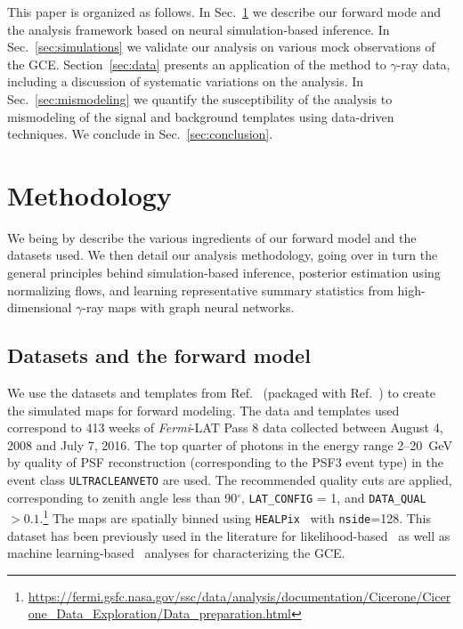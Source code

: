 \documentclass[prd,aps,10pt,nofootinbib,twocolumn,superscriptaddress,preprintnumbers,balancelastpage,longbibliography]{revtex4-1}
\begin{document}
This paper is organized as follows. In Sec.~\ref{sec:analysis} we describe our forward mode and the analysis framework based on neural simulation-based inference. In Sec.~\ref{sec:simulations} we validate our analysis on various mock observations of the \Fermi GCE. Section~\ref{sec:data} presents an application of the method to \Fermi $\gamma$-ray data, including a discussion of systematic variations on the analysis. In Sec.~\ref{sec:mismodeling} we quantify the susceptibility of the analysis to mismodeling of the signal and background templates using data-driven techniques. We conclude in Sec.~\ref{sec:conclusion}.

\section{Methodology}
\label{sec:analysis}

We being by describe the various ingredients of our forward model and the datasets used. We then detail our analysis methodology, going over in turn the general principles behind simulation-based inference, posterior estimation using normalizing flows, and learning representative summary statistics from high-dimensional $\gamma$-ray maps with graph neural networks.

\subsection{Datasets and the forward model}
\label{sec:datasets}

We use the datasets and templates from Ref.~\cite{rodd_nicholas_safdi_siddharth_2016} (packaged with Ref.~\cite{Mishra-Sharma:2016gis}) to create the simulated maps for forward modeling. The data and templates used correspond to 413 weeks of \emph{Fermi}-LAT Pass 8 data collected between August 4, 2008 and July 7, 2016. The top quarter of photons in the energy range 2--20~GeV by quality of PSF reconstruction (corresponding to the PSF3 event type) in the event class \texttt{ULTRACLEANVETO} are used. The recommended quality cuts are applied, corresponding to zenith angle less than 90$^\circ$, \texttt{LAT\_CONFIG} = 1, and \texttt{DATA\_QUAL} $> 0.1$.\footnote{\url{https://fermi.gsfc.nasa.gov/ssc/data/analysis/documentation/Cicerone/Cicerone_Data_Exploration/Data_preparation.html}} The maps are spatially binned using \texttt{HEALPix}~\cite{Gorski:2004by} with \texttt{nside}=128. This dataset has been previously used in the literature for likelihood-based~\cite{Buschmann:2020adf,Chang:2019ars,Leane:2019xiy} as well as machine learning-based~\cite{List:2020mzd} analyses for characterizing the GCE. 
\end{document}
